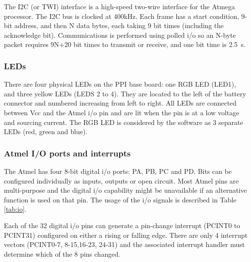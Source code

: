 \documentclass[11pt,fleqn]{article}
\begin{document}
The I2C (or TWI) interface is a high-speed two-wire interface for the Atmega processor.
The I2C bus is clocked at 400\unit{kHz}.  Each frame has a start condition, 9-bit address, and then N data bytes, each taking 9 bit times (including the acknowledge bit).
Communications is performed using polled i/o so an N-byte packet requires 9N+20 bit times to transmit or receive, and one bit time
is 2.5\unit{\mu s}.

\subsubsection{LEDs}\label{sec:leds}
There are four physical LEDs on the PPI base board: one RGB LED (LED1), and three yellow LEDs (LEDS 2 to 4).
They are located to the left of the battery connector and numbered increasing from left to right.
All LEDs are connected between Vcc and the Atmel i/o pin and are lit when the pin is at a low voltage and sourcing current.
The RGB LED is considered by the software as 3 separate LEDs (red, green and blue).  


\subsubsection{Atmel I/O ports and interrupts}
The Atmel has four 8-bit digital i/o ports: PA, PB, PC and PD.  Bits can be configured individually as inputs, outputs or open circuit.  Most Atmel pins are 
multi-purpose and the digital i/o capability might be unavailable if an alternative function is used on that pin.
The usage of the i/o signals is described in Table \ref{tab:io}.

Each of the 32 digital i/o pins can generate a pin-change interrupt (PCINT0 to PCINT31) configured on either a rising or falling edge.
There are only 4 interrupt vectors (PCINT0-7, 8-15,16-23, 24-31) and the associated interrupt handler must determine which of the 8 pins changed.
\end{document}
